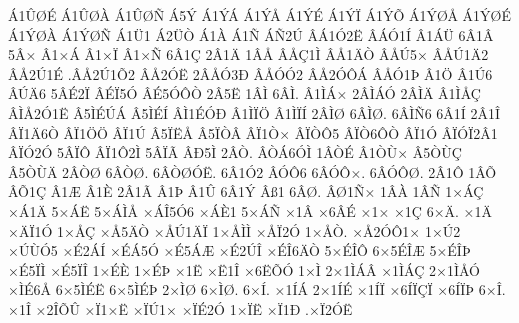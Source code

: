 {^^c11^^db^^d8^^c9
^^c11^^db^^d8^^c0
^^c11^^db^^d8^^d1
^^c15^^dd
^^c11^^dd^^c1
^^c11^^dd^^c5
^^c11^^dd^^c9
^^c11^^dd^^cf
^^c11^^dd^^d5
^^c11^^dd^^d8^^c5
^^c11^^dd^^d8^^c9
^^c11^^dd^^d8^^c0
^^c11^^dd^^d8^^d1
^^c11^^dc1
^^c12^^dc^^d2
^^c11^^c0
^^c11^^d1
^^c1^^d12^^da
^^c2^^c11^^d32^^cb
^^c2^^c1^^d31^^cd
^^c21^^c1^^dc
6^^c21^^c2
5^^c2^^d7
^^c21^^d7^^c1
^^c21^^d7^^cf
^^c21^^d7^^d1
6^^c21^^c7
2^^c21^^c4
1^^c2^^c5
^^c2^^c5^^c71^^cc
^^c2^^c51^^c4^^d2
^^c2^^c5^^da5^^d7
^^c2^^c5^^da1^^c42
^^c2^^c52^^da1^^c9
.^^c2^^c52^^da1^^d52
^^c2^^c52^^d3^^cb
2^^c2^^c5^^d33^^d0
^^c2^^c5^^d3^^d32
^^c2^^c52^^d3^^d4^^c1
^^c2^^c5^^d31^^de
^^c21^^d6
^^c21^^da6
^^c2^^da^^c46
5^^c2^^c92^^cf
^^c2^^c9^^cf5^^d3
^^c2^^c95^^d3^^d4^^d2
2^^c25^^cb
1^^c2^^cc
6^^c2^^cc.
^^c21^^cc^^c1^^d7
2^^c2^^cc^^c1^^d3
2^^c2^^cc^^c4
^^c21^^cc^^c5^^c7
^^c2^^cc^^c52^^d31^^cb
^^c25^^cc^^c9^^da^^c1
^^c25^^cc^^c9^^cd
^^c2^^cc1^^c9^^d3^^d0
^^c21^^cc^^cf^^d6
^^c21^^cc^^cf^^cd
2^^c2^^cc^^d8
6^^c2^^cc^^d8.
6^^c2^^cc^^d16
6^^c21^^cd
2^^c21^^ce
^^c2^^cf1^^c46^^d2
^^c2^^cf1^^d6^^d6
^^c2^^cf1^^da
^^c25^^cf^^cb^^c5
^^c25^^cf^^d2^^c2
^^c2^^cf1^^d2^^d7
^^c2^^cf^^d2^^d45
^^c2^^cf^^d26^^d4^^d2
^^c2^^cf1^^d3
^^c2^^cf^^d3^^cf2^^c21
^^c2^^cf^^d32^^d3
5^^c2^^cf^^d4
^^c2^^cf1^^d42^^cc
5^^c2^^cf^^c3
^^c2^^d05^^cc
2^^c2^^d2.
^^c2^^d2^^c16^^d3^^cc
1^^c2^^d2^^c9
^^c21^^d2^^d9^^d7
^^c25^^d2^^d9^^c7
^^c25^^d2^^d9^^c4
2^^c2^^d2^^d8
6^^c2^^d2^^d8.
6^^c2^^d2^^d8^^d3^^cb.
6^^c21^^d32
^^c2^^d3^^d46
6^^c2^^d3^^d4^^d7.
6^^c2^^d3^^d4^^d8.
2^^c21^^d4
1^^c2^^d5
^^c2^^d51^^c7
^^c21^^c6
^^c21^^c8
2^^c21^^c3
^^c21^^de
^^c21^^db
6^^c21^^dd
^^c2^^df1
6^^c2^^d8.
^^c2^^d81^^d1^^d7
1^^c2^^c0
1^^c2^^d1
1^^d7^^c1^^c7
^^d7^^c11^^c4
5^^d7^^c1^^cb
5^^d7^^c1^^cc^^c5
^^d7^^c1^^ce5^^d36
^^d7^^c1^^c81
5^^d7^^c1^^d1
^^d71^^c2
^^d76^^c2^^c9
^^d71^^d7
^^d71^^c7
6^^d7^^c4.
^^d71^^c4
^^d7^^c4^^cf1^^d3
1^^d7^^c5^^c7
^^d7^^c55^^c4^^d2
^^d7^^c5^^da1^^c4^^cf
1^^d7^^c5^^cc^^cc
^^d7^^c5^^cf2^^d3
1^^d7^^c5^^d2.
^^d7^^c52^^d3^^d41^^d7
1^^d7^^da2
^^d7^^da^^d9^^d35
^^d7^^c92^^c1^^cd
^^d7^^c9^^c15^^d3
^^d7^^c95^^c1^^c6
^^d7^^c92^^da^^ce
^^d7^^c9^^ce6^^c4^^d2
5^^d7^^c9^^ce^^d4
6^^d75^^c9^^ce^^c6
5^^d7^^c9^^ce^^de
^^d7^^c95^^cf^^cc
^^d7^^c95^^cf^^ce
1^^d7^^c9^^c8
1^^d7^^c9^^de
^^d71^^cb
^^d7^^cb1^^ce
^^d76^^cb^^d5^^d3
1^^d7^^cc
2^^d71^^cc^^c1^^c2
^^d71^^cc^^c1^^c7
2^^d71^^cc^^c5^^d3
^^d7^^cc^^c96^^c5
6^^d75^^cc^^c9^^cb
6^^d75^^cc^^c9^^de
2^^d7^^cc^^d8
6^^d7^^cc^^d8.
6^^d7^^cd.
^^d71^^cd^^c1
2^^d71^^cd^^c9
^^d71^^cd^^cf
^^d76^^cd^^cf^^c7^^cf
^^d76^^cd^^cf^^de
6^^d7^^ce.
^^d71^^ce
^^d72^^ce^^d5^^db
^^d7^^cf1^^d7^^cb
^^d7^^cf^^da1^^d7
^^d7^^cf^^c92^^d3
1^^d7^^cf^^cb
^^d7^^cf1^^d0
.^^d7^^cf2^^d3^^cb
}
